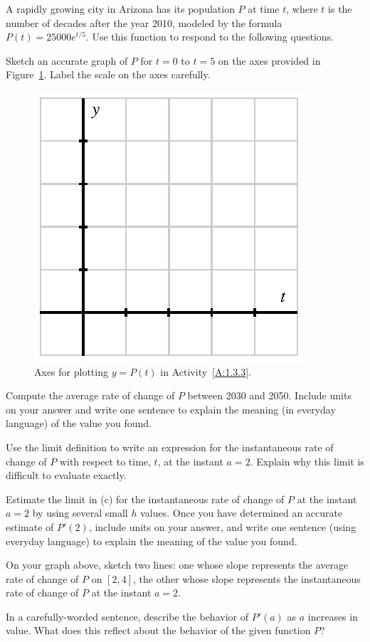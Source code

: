 \begin{activity}  \label{A:1.3.3}
A rapidly growing city in Arizona has its population $P$ at time $t$, where $t$ is the number of decades after the year 2010, modeled by the formula $P(t) = 25000 e^{t/5}$.  Use this function to respond to the following questions.
\ba
	\item Sketch an accurate graph of $P$ for $t = 0$ to $t = 5$ on the axes provided in Figure~\ref{F:1.3.Act3}.  Label the scale on the axes carefully.
	\begin{figure}[h]
	\begin{center}
	\includegraphics{figures/1_3_Act3.eps} 
	\caption{Axes for plotting $y = P(t)$ in Activity~\ref{A:1.3.3}.} \label{F:1.3.Act3}
	\end{center}
	\end{figure}
	
	\item Compute the average rate of change of $P$ between 2030 and 2050.  Include units on your answer and write one sentence to explain the meaning (in everyday language) of the value you found.
	\item Use the limit definition to write an expression for the instantaneous rate of change of $P$ with respect to time, $t$, at the instant $a = 2$.  Explain why this limit is difficult to evaluate exactly.  
	\item Estimate the limit in (c) for the instantaneous rate of change of $P$ at the instant $a = 2$ by using several small $h$ values.  Once you have determined an accurate estimate of $P'(2)$, include units on your answer, and write one sentence (using everyday language) to explain the meaning of the value you found.
	\item On your graph above, sketch two lines:  one whose slope represents the average rate of change of $P$ on $[2,4]$, the other whose slope represents the instantaneous rate of change of $P$ at the instant $a=2$.
	\item In a carefully-worded sentence, describe the behavior of $P'(a)$ as $a$ increases in value.  What does this reflect about the behavior of the given function $P$?
\ea
\end{activity}
